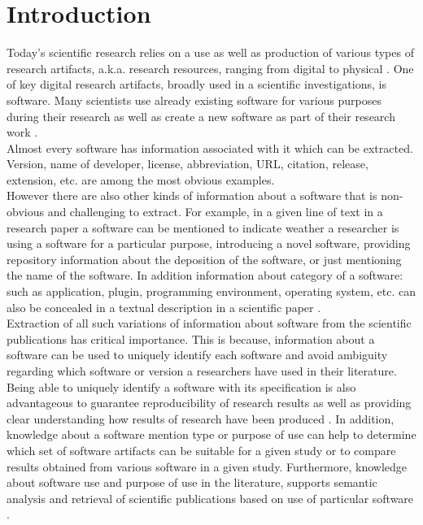 \chapter{Introduction}
\label{ch:intro}

Today’s scientific research relies on a use as well as production of various types of research artifacts, a.k.a. research resources, ranging from digital to physical \citep{schindler2019annotation}. One of key digital research artifacts, broadly used in a scientific investigations, is software. Many scientists use already existing software for various purposes during their research as well as create a new software as part of their research work \citep{goble2014better, hannay2009scientists}. \\

Almost every software has information associated with it which can be extracted. Version, name of developer, license, abbreviation, URL, citation, release, extension, etc. are among the most obvious examples.  \\

However there are also other kinds of information about a software that is non-obvious and challenging to extract. For  example, in a given line of text in a research paper a software can be mentioned to indicate weather a researcher is using a software for a particular purpose, introducing a novel software, providing repository information about the deposition of the software, or just mentioning the name of the software. In addition information about category of a software: such as application, plugin, programming environment, operating system, etc.  can also be concealed in a textual description in a scientific paper \citep{schindler2021somesci}. \\

Extraction of all such variations of information about software from the scientific publications has critical importance. This is because, information about a software can be used to uniquely identify each software and avoid ambiguity regarding which software or version a researchers have used in their literature. Being able to uniquely identify a software with its specification is also advantageous to guarantee reproducibility of research results as well as providing clear understanding how results of research have been produced \citep{kruger2019literature}. In addition, knowledge about a software mention type or purpose of use can help to determine which set of software artifacts can be suitable for a given study or to compare results obtained from various software in a given study. Furthermore, knowledge about software use and purpose of use in the literature, supports semantic analysis and retrieval of scientific publications based on use of particular software \citep{schindler2019annotation}. \\

